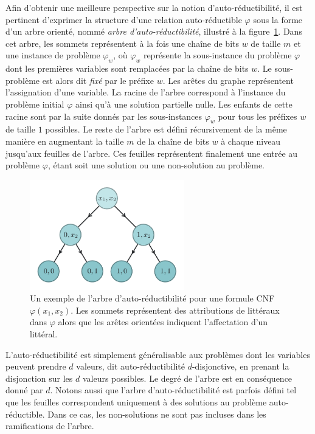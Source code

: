 Afin d'obtenir une meilleure perspective sur la notion d'auto-réductibilité, il est pertinent d'exprimer la structure d'une relation auto-réductible $\varphi$ sous la forme d'un arbre orienté, nommé \textit{arbre d'auto-réductibilité}, illustré à la figure~\ref{fig:arbre-auto-reductibilite}. Dans cet arbre, les sommets représentent à la fois une chaîne de bits $w$ de taille $m$ et une instance de problème $\varphi_{w}$, où $\varphi_{w}$ représente la sous-instance du problème $\varphi$ dont les premières variables sont remplacées par la chaîne de bits $w$. Le sous-problème est alors dit \textit{fixé} par le préfixe $w$. Les arêtes du graphe représentent l'assignation d'une variable. La racine de l'arbre correspond à l'instance du problème initial $\varphi$ ainsi qu'à une solution partielle nulle. Les enfants de cette racine sont par la suite donnés par les sous-instances $\varphi_{w}$ pour tous les préfixes $w$ de taille $1$ possibles. Le reste de l'arbre est défini récursivement de la même manière en augmentant la taille $m$ de la chaîne de bits $w$ à chaque niveau jusqu'aux feuilles de l'arbre. Ces feuilles représentent finalement une entrée au problème $\varphi$, étant soit une solution ou une non-solution au problème.

\begin{figure}[h!]
    \centering
    \includegraphics[width=0.6\textwidth]{figures/self-reducibility-tree.pdf}
    \caption[Arbre d'auto-réductibilité]{Un exemple de l'arbre d'auto-réductibilité pour une formule CNF $\varphi(x_{1}, x_{2})$. Les sommets représentent des attributions de littéraux dans $\varphi$ alors que les arêtes orientées indiquent l'affectation d'un littéral.}
    \label{fig:arbre-auto-reductibilite}
\end{figure}

L'auto-réductibilité est simplement généralisable aux problèmes dont les variables peuvent prendre $d$ valeurs, dit auto-réductibilité $d$-disjonctive, en prenant la disjonction sur les $d$ valeurs possibles. Le degré de l'arbre est en conséquence donné par $d$. Notons aussi que l'arbre d'auto-réductibilité est parfois défini tel que les feuilles correspondent uniquement à des solutions au problème auto-réductible. Dans ce cas, les non-solutions ne sont pas incluses dans les ramifications de l'arbre.

